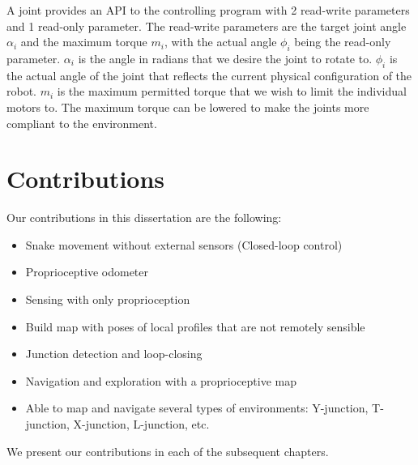 A joint provides an API to the controlling program with 2 read-write parameters and 1 read-only parameter.  The read-write parameters are the target joint angle $\alpha_i$ and the maximum torque $m_i$, with the actual angle $\phi_i$ being the read-only parameter.  $\alpha_i$ is the angle in radians that we desire the joint to rotate to.  $\phi_i$ is the actual angle of the joint that reflects the current physical configuration of the robot.  $m_i$ is the maximum permitted torque that we wish to limit the individual motors to.  The maximum torque can be lowered to make the joints more compliant to the environment.



\section{Contributions}

Our contributions in this dissertation are the following:

\begin{itemize}
\item Snake movement without external sensors (Closed-loop control)
\item Proprioceptive odometer
\item Sensing with only proprioception
\item Build map with poses of local profiles that are not remotely sensible
\item Junction detection and loop-closing
\item Navigation and exploration with a proprioceptive map
\item Able to map and navigate several types of environments:  Y-junction, T-junction, X-junction, L-junction, etc.
\end{itemize}

We present our contributions in each of the subsequent chapters.

